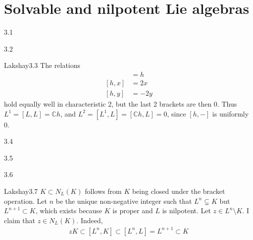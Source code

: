 \chapter{Solvable and nilpotent Lie algebras}

\begin{solution}{}{3.1}
    
\end{solution}

\begin{solution}{}{3.2}

\end{solution}

\begin{solution}{Lakshay}{3.3}
    The relations
    \begin{align*}
        [x,y] &= h \\
        [h,x] &= 2x \\
        [h,y] &= -2y
    \end{align*}
    hold equally well in characteristic 2, but the last 2 brackets are then 0. Thus $ L^{1} = [L, L] = \mathbb{C}h $, and $ L^{2} = [L^{1}, L] = [ \mathbb{C}h, L] = 0 $, since $ [h, -] $ is uniformly 0.
\end{solution}

\begin{solution}{}{3.4}

\end{solution}

\begin{solution}{}{3.5}
    
\end{solution}

\begin{solution}{}{3.6}

\end{solution}

\begin{solution}{Lakshay}{3.7}
    $ K \subset N_{L}(K) $ follows from $ K $ being closed under the bracket operation. Let $ n $ be the unique non-negative integer such that $ L^{n} \subsetneq K $ but $ L^{n+1} \subset K $, which exists because $ K $ is proper and $ L $ is nilpotent. Let $ z\in L^{n} \setminus K $. I claim that $ z\in N_{L}(K) $. Indeed,
    \begin{align*}
        zK \subset [L^{n}, K]
        \subset [L^{n}, L] = L^{n+1}
        \subset K
    \end{align*}
\end{solution}

